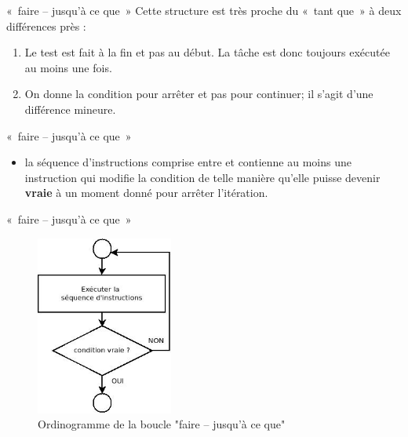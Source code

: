 \begin{frame}{«~faire – jusqu'à ce que~»}
	Cette structure est très proche du «~tant que~» 
	à deux différences près :
	
	\begin{enumerate}
		\item {
			Le test est fait à la fin et pas au début. La tâche est donc toujours
			exécutée au moins une fois. }
		\item {
			On donne la condition pour arrêter et pas pour continuer; il
			s'agit d'une différence mineure.}
	\end{enumerate}

	\bigskip
	
\end{frame}

\begin{frame}{«~faire – jusqu'à ce que~»}
	\begin{itemize}
		\item 
			la séquence d’instructions comprise entre
			 et  
			contienne au moins une instruction qui modifie la condition de
			telle manière qu’elle puisse devenir \textbf{vraie} à un moment donné
			pour arrêter l'itération. 
	\end{itemize}
\end{frame}

\begin{frame}{«~faire – jusqu'à ce que~»}
	\begin{figure}[h]
	\centering
	\includegraphics[width=0.4\textwidth]{image/boucle-faire}
	\caption{Ordinogramme de la boucle "faire – jusqu'à ce que"}
	\label{fig:boucle-faire}
	\end{figure}
\end{frame}


